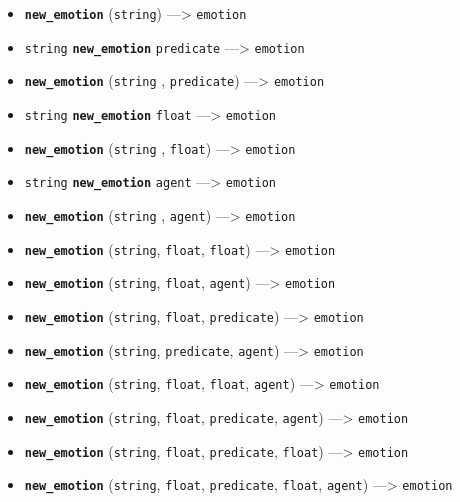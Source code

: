 \documentclass[]{book}
\providecommand{\tightlist}{%
  \setlength{\itemsep}{0pt}\setlength{\parskip}{0pt}}
\theoremstyle{definition}
\theoremstyle{definition}
\theoremstyle{definition}
\theoremstyle{remark}
\begin{document}
\begin{itemize}
\tightlist
\item
  \textbf{\texttt{new\_emotion}} (\texttt{string}) ---\textgreater{}
  \texttt{emotion}
\item
  \texttt{string} \textbf{\texttt{new\_emotion}} \texttt{predicate}
  ---\textgreater{} \texttt{emotion}
\item
  \textbf{\texttt{new\_emotion}} (\texttt{string} , \texttt{predicate})
  ---\textgreater{} \texttt{emotion}
\item
  \texttt{string} \textbf{\texttt{new\_emotion}} \texttt{float}
  ---\textgreater{} \texttt{emotion}
\item
  \textbf{\texttt{new\_emotion}} (\texttt{string} , \texttt{float})
  ---\textgreater{} \texttt{emotion}
\item
  \texttt{string} \textbf{\texttt{new\_emotion}} \texttt{agent}
  ---\textgreater{} \texttt{emotion}
\item
  \textbf{\texttt{new\_emotion}} (\texttt{string} , \texttt{agent})
  ---\textgreater{} \texttt{emotion}
\item
  \textbf{\texttt{new\_emotion}} (\texttt{string}, \texttt{float},
  \texttt{float}) ---\textgreater{} \texttt{emotion}
\item
  \textbf{\texttt{new\_emotion}} (\texttt{string}, \texttt{float},
  \texttt{agent}) ---\textgreater{} \texttt{emotion}
\item
  \textbf{\texttt{new\_emotion}} (\texttt{string}, \texttt{float},
  \texttt{predicate}) ---\textgreater{} \texttt{emotion}
\item
  \textbf{\texttt{new\_emotion}} (\texttt{string}, \texttt{predicate},
  \texttt{agent}) ---\textgreater{} \texttt{emotion}
\item
  \textbf{\texttt{new\_emotion}} (\texttt{string}, \texttt{float},
  \texttt{float}, \texttt{agent}) ---\textgreater{} \texttt{emotion}
\item
  \textbf{\texttt{new\_emotion}} (\texttt{string}, \texttt{float},
  \texttt{predicate}, \texttt{agent}) ---\textgreater{} \texttt{emotion}
\item
  \textbf{\texttt{new\_emotion}} (\texttt{string}, \texttt{float},
  \texttt{predicate}, \texttt{float}) ---\textgreater{} \texttt{emotion}
\item
  \textbf{\texttt{new\_emotion}} (\texttt{string}, \texttt{float},
  \texttt{predicate}, \texttt{float}, \texttt{agent}) ---\textgreater{}
  \texttt{emotion}
\end{itemize}
\end{document}

